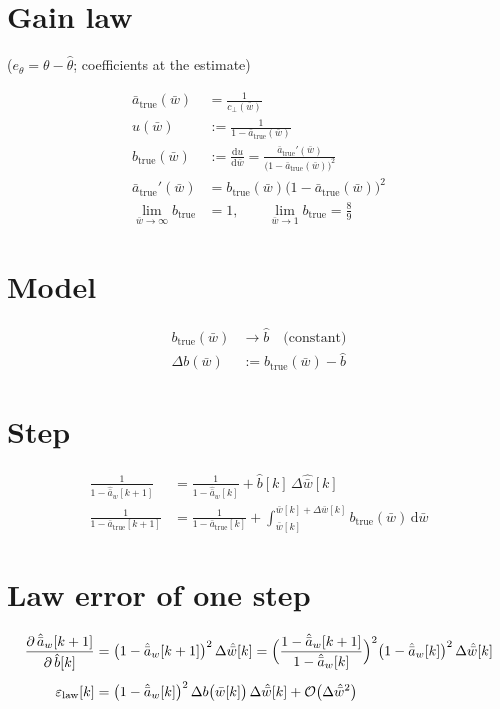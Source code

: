 \documentclass[11pt,a4paper,fontset=none]{ctexart}
\newcommand{\ba}{\bar{a}}
\newcommand{\bw}{\bar{w}}
\newcommand{\dWh}{\Delta\hat{\bw}}
\newcommand{\ah}{\hat{\ba}_w}
\newcommand{\bh}{\hat{b}}
\begin{document}
\section{Gain law}

($e_\theta = \theta - \hat\theta$; coefficients at the estimate)

\begin{align*}
\ba_{\mathrm{true}}(\bw) &= \frac{1}{c_\perp(\bw)} \\
u(\bw) &:= \frac{1}{1 - \ba_{\mathrm{true}}(\bw)} \\
b_{\mathrm{true}}(\bw) &:= \frac{\mathrm{d}u}{\mathrm{d}\bw} = \frac{\ba_{\mathrm{true}}'(\bw)}{\bigl(1-\ba_{\mathrm{true}}(\bw)\bigr)^{2}} \\
\ba_{\mathrm{true}}'(\bw) &= b_{\mathrm{true}}(\bw)\bigl(1-\ba_{\mathrm{true}}(\bw)\bigr)^{2} \\
\lim_{\bw \to \infty} b_{\mathrm{true}} &= 1, \qquad \lim_{\bw \to 1} b_{\mathrm{true}} = \frac{8}{9}
\end{align*}

\section{Model}

\begin{align*}
b_{\mathrm{true}}(\bw) &\longrightarrow \bh \quad \text{(constant)} \\
\Delta b(\bw) &:= b_{\mathrm{true}}(\bw) - \bh
\end{align*}

\section{Step}

\begin{align*}
\frac{1}{1-\ah[k+1]} &= \frac{1}{1-\ah[k]} + \bh[k]\,\dWh[k] \\
\frac{1}{1-\ba_{\mathrm{true}}[k+1]} &= \frac{1}{1-\ba_{\mathrm{true}}[k]}
   + \int_{\bw[k]}^{\bw[k]+\Delta\bw[k]} b_{\mathrm{true}}(\bw)\,\mathrm{d}\bw
\end{align*}

\section{Law error of one step}

\begin{align*}
\frac{\partial\,\ah[k+1]}{\partial\,\bh[k]} &= \bigl(1-\ah[k+1]\bigr)^{2}\,\dWh[k]
   = \Bigl(\frac{1-\ah[k+1]}{1-\ah[k]}\Bigr)^{2}\bigl(1-\ah[k]\bigr)^{2}\,\dWh[k] \\[4pt]
\varepsilon_{\mathrm{law}}[k] &= \bigl(1-\ah[k]\bigr)^{2}\,\Delta b\bigl(\bw[k]\bigr)\,\dWh[k] + \mathcal{O}\bigl(\dWh^{2}\bigr)
\end{align*}
\end{document}
